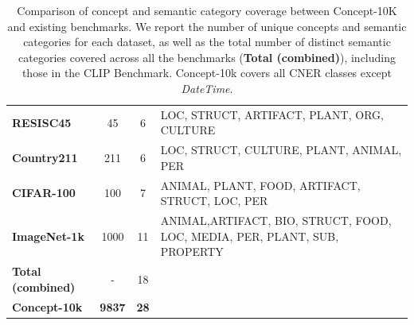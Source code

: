 \documentclass[11pt]{article}
\newcommand{\benchmark}{Concept-10k}
\begin{document}
\begin{table}[t]
\begin{tabularx}{\textwidth}{lcc>{\raggedright\arraybackslash}X}
\textbf{RESISC45} & 45 & 6 & LOC, STRUCT, ARTIFACT, PLANT, ORG, CULTURE \\
\textbf{Country211} & 211 & 6 & LOC, STRUCT, CULTURE, PLANT, ANIMAL, PER \\
\textbf{CIFAR-100} & 100 & 7 & ANIMAL, PLANT, FOOD, ARTIFACT, STRUCT, LOC, PER \\
\textbf{ImageNet-1k}  & 1000 & 11 & ANIMAL,ARTIFACT, BIO, STRUCT, FOOD, LOC, MEDIA, PER, PLANT, SUB, PROPERTY \\
  \midrule

     \textbf{Total (combined)} & - & 18 \\
  \midrule
   \textbf{Concept-10k} & \textbf{9837} & \textbf{28}\\
    \bottomrule
\end{tabularx}
\caption{Comparison of concept and semantic category coverage between Concept-10K and existing benchmarks. We report the number of unique concepts and semantic categories for each dataset, as well as the total number of distinct semantic categories covered across all the benchmarks (\textbf{Total (combined)}), including those in the CLIP Benchmark. \benchmark{} covers all CNER classes except \textit{DateTime}.
}
\label{tab:datasets_summary}

\end{table}
\end{document}
